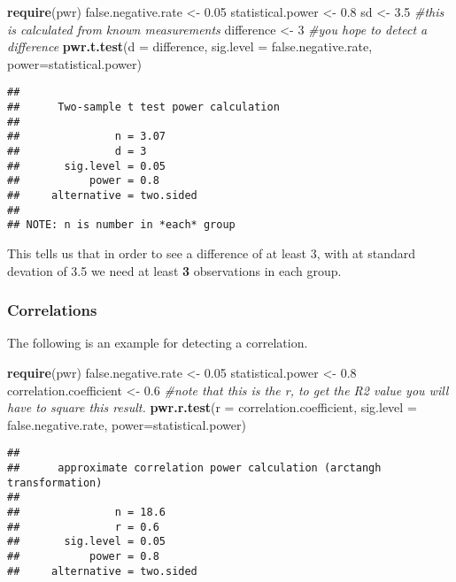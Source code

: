 \documentclass[]{article}
\newenvironment{Shaded}{\begin{snugshade}}{\end{snugshade}}
\newcommand{\KeywordTok}[1]{\textcolor[rgb]{0.13,0.29,0.53}{\textbf{{#1}}}}
\newcommand{\DataTypeTok}[1]{\textcolor[rgb]{0.13,0.29,0.53}{{#1}}}
\newcommand{\DecValTok}[1]{\textcolor[rgb]{0.00,0.00,0.81}{{#1}}}
\newcommand{\FloatTok}[1]{\textcolor[rgb]{0.00,0.00,0.81}{{#1}}}
\newcommand{\StringTok}[1]{\textcolor[rgb]{0.31,0.60,0.02}{{#1}}}
\newcommand{\CommentTok}[1]{\textcolor[rgb]{0.56,0.35,0.01}{\textit{{#1}}}}
\newcommand{\NormalTok}[1]{{#1}}
\begin{document}
\begin{Shaded}
\begin{Highlighting}[]
\KeywordTok{require}\NormalTok{(pwr)}
\NormalTok{false.negative.rate <-}\StringTok{ }\FloatTok{0.05}
\NormalTok{statistical.power <-}\StringTok{ }\FloatTok{0.8}
\NormalTok{sd <-}\StringTok{ }\FloatTok{3.5} \CommentTok{#this is calculated from known measurements}
\NormalTok{difference <-}\StringTok{ }\DecValTok{3}  \CommentTok{#you hope to detect a difference }
\KeywordTok{pwr.t.test}\NormalTok{(}\DataTypeTok{d =} \NormalTok{difference, }\DataTypeTok{sig.level =} \NormalTok{false.negative.rate, }\DataTypeTok{power=}\NormalTok{statistical.power)}
\end{Highlighting}
\end{Shaded}

\begin{verbatim}
## 
##      Two-sample t test power calculation 
## 
##               n = 3.07
##               d = 3
##       sig.level = 0.05
##           power = 0.8
##     alternative = two.sided
## 
## NOTE: n is number in *each* group
\end{verbatim}

This tells us that in order to see a difference of at least 3, with at
standard devation of 3.5 we need at least \textbf{3} observations in
each group.

\subsubsection{Correlations}\label{correlations}

The following is an example for detecting a correlation.

\begin{Shaded}
\begin{Highlighting}[]
\KeywordTok{require}\NormalTok{(pwr)}
\NormalTok{false.negative.rate <-}\StringTok{ }\FloatTok{0.05}
\NormalTok{statistical.power <-}\StringTok{ }\FloatTok{0.8}
\NormalTok{correlation.coefficient <-}\StringTok{ }\FloatTok{0.6} \CommentTok{#note that this is the r, to get the R2 value you will have to square this result.}
\KeywordTok{pwr.r.test}\NormalTok{(}\DataTypeTok{r =} \NormalTok{correlation.coefficient, }\DataTypeTok{sig.level =} \NormalTok{false.negative.rate, }\DataTypeTok{power=}\NormalTok{statistical.power)}
\end{Highlighting}
\end{Shaded}

\begin{verbatim}
## 
##      approximate correlation power calculation (arctangh transformation) 
## 
##               n = 18.6
##               r = 0.6
##       sig.level = 0.05
##           power = 0.8
##     alternative = two.sided
\end{verbatim}
\end{document}
